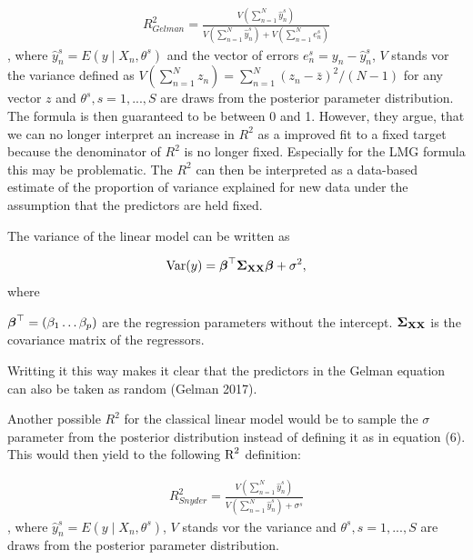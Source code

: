 \documentclass[11pt,a4paper,twoside]{book}\usepackage[]{graphicx}\usepackage[]{color}
\begin{document}
      \begin{align} 
        R^2_{Gelman} = \frac{V(\sum_{n=1}^{N}\hat{y}^s_{n})}{V(\sum_{n=1}^{N}\hat{y}^s_{n})+V(\sum_{n=1}^{N}e^s_{n})} \label{eq:6} 
   \end{align} 
, where $\hat{y}^s_{n}  = E \left({y \mid X_{n}, \theta^s}\right) $ and the vector of errors $e^s_{n} = y_{n} - \hat{y}^s_{n}$, $V$ stands vor the variance defined as $V(\sum_{n=1}^{N} z_{n}) = \sum_{n=1}^{N} (z_{n} - \bar{z})^2 / (N-1)$ for any vector $z$ and $\theta^s, s = 1, ... , S$ are draws from the posterior parameter distribution. The formula is then guaranteed to be between 0 and 1.  However, they argue, that we can no longer interpret an increase in $R^2$ as a improved fit to a fixed target because the denominator of $R^2$ is no longer fixed. Especially for the LMG formula this may be problematic. The $R^2$ can then be interpreted as a data-based estimate of the proportion of variance explained for new data under the assumption that the predictors are held fixed. 

The variance of the linear model can be written as 

      \begin{align} 
        \operatorname{Var}(y) = {\boldsymbol{\beta}}^\top {\boldsymbol{\Sigma}}{}_{{\mathbf{X}} {\mathbf{X}}}  {\boldsymbol{\beta}} + \sigma^2, \label{eq:6} 
   \end{align}
where 

${\boldsymbol{\beta}}^\top = (\beta_{1} \dots \beta_{p})$ are the regression parameters without the intercept.
${\boldsymbol{\Sigma}}{}_{{\mathbf{X}} {\mathbf{X}}}$ is the covariance matrix of the regressors.

Writting it this way makes it clear that the predictors in the Gelman equation can also be taken as random (Gelman 2017). 

Another possible $R^2$ for the classical linear model would be to sample the  $\sigma$ parameter from the posterior distribution instead of defining it as in equation (6). This would then yield to the following $\text{R}^2$ definition:

    \begin{align} 
        R^2_{Snyder} = \frac{V(\sum_{n=1}^{N}\hat{y}^s_{n})}{V(\sum_{n=1}^{N}\hat{y}^s_{n})+\sigma^s} \label{eq:11} 
   \end{align} 
 , where $\hat{y}^s_{n}  = E \left({y \mid X_{n}, \theta^s}\right) $,  $V$ stands vor the variance and $\theta^s, s = 1, ... , S$ are draws from the posterior parameter distribution.
 
\end{document}
